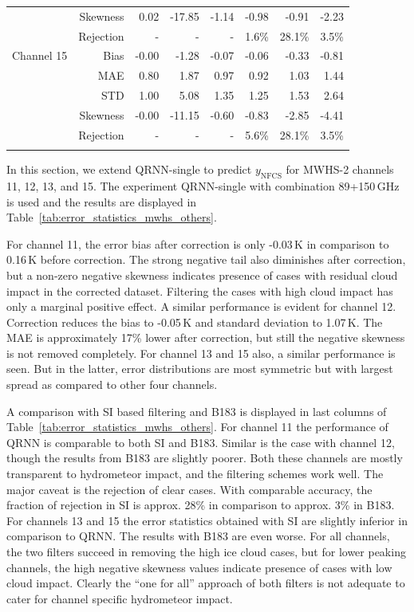 \documentclass[amt, manuscript]{copernicus}
\newcommand{\ynfcs}{y_\text{NFCS}}
\begin{document}
\begin{table}[t]
\begin{tabular}{lrrr|rr|rr}
					& Skewness  &  0.02 & -17.85 & -1.14 & -0.98  		& -0.91  & -2.23 \\	
					& Rejection   & -    & -      & -	  & 1.6\%        & 28.1\% & 3.5\%  \\	
		\middlehline
		Channel 15  & Bias      & -0.00 &  -1.28 & -0.07 & -0.06        & -0.33 &  -0.81 \\
					& MAE       &  0.80 &   1.87 &  0.97 &  0.92 		&  1.03 &	1.44 \\
					& STD       &  1.00 &   5.08 &  1.35 &  1.25 		&  1.53 &	2.64 \\
					& Skewness  & -0.00 & -11.15 & -0.60 & -0.83 		& -2.85 &  -4.41 \\ 
					& Rejection & -     & -      & -	 & 5.6\%        & 28.1\% & 3.5\%  \\
		\bottomhline
	\end{tabular}
\end{table}

In this section, we extend QRNN-single to predict $\ynfcs$ for MWHS-2 channels 11, 12, 13, and 15. The experiment QRNN-single with combination 89+150\,GHz is used and the results are displayed in Table~\ref{tab:error_statistics_mwhs_others}.

For channel 11, the error bias after correction is only -0.03\,K in comparison to 0.16\,K before correction. The strong negative tail also diminishes after correction, but a non-zero negative skewness indicates presence of cases with residual cloud impact in the corrected dataset. Filtering the cases with high cloud impact has only a marginal positive effect. A similar performance is evident for channel 12. Correction reduces the bias to -0.05\,K and standard deviation to 1.07\,K. The MAE is approximately 17\% lower after correction, but still the negative skewness is not removed completely. For channel 13 and 15 also, a similar performance is seen. But in the latter, error distributions are most symmetric but with largest spread as compared to other four channels.

A comparison with SI based filtering and B183 is displayed in last columns of Table~\ref{tab:error_statistics_mwhs_others}. For channel 11 the performance of QRNN is comparable to both SI and B183. Similar is the case with channel 12, though the results from B183 are slightly poorer. Both these channels are mostly transparent to hydrometeor impact, and the filtering schemes work well. The major caveat is the rejection of clear cases. With comparable accuracy, the fraction of rejection in SI is approx. 28\% in comparison to approx. 3\% in B183. For channels 13 and 15 the error statistics obtained with SI are slightly inferior in comparison to QRNN. The results with B183 are even worse. For all channels, the two filters succeed in removing the high ice cloud cases, but for lower peaking channels, the high negative skewness values indicate presence of cases with low cloud impact. Clearly the ``one for all'' approach of both filters is not adequate to cater for channel specific hydrometeor impact.  
\end{document}
